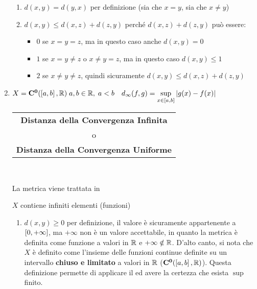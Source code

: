\begin{example}
\begin{enumerate}
\begin{enumerate}[label=\arabic*.]
				\item $d(x,y)=d(y,x)$ per definizione (sia che $x = y$, sia che $x \neq y$)
				\item $d(x,y) \leq d(x,z) + d(z,y)$ perché $d(x,z) + d(z,y)$ può essere:
					\begin{itemize}
						\item $0$ se $x = y = z$, ma in questo caso anche $d(x,y) = 0$
						\item $1$ se $x = y \neq z$ o $x \neq y = z$, ma in questo caso $d(x,y) \leq 1$
						\item $2$ se $x \neq y \neq z$, quindi sicuramente $d(x,y) \leq d(x,z) + d(z,y)$
					\end{itemize}
			\end{enumerate}
		\item $X=\mathbf{C^{0}}(\left[a,b\right],\mathbb{R})\;a,b\in\mathbb{R},\;a<b \quad d_\infty(f,g) = \sup\limits_{x\in\left[a,b\right]}\left|g(x)-f(x)\right|$ \hfill
			{\footnotesize
				\begin{tabular}{c}
					\textbf{Distanza della Convergenza Infinita}\\
					o\\
					\textbf{Distanza della Convergenza Uniforme}
				\end{tabular}
			}\label{ex:dim_dist_conv_unif}\\
			\begin{note}
				La metrica viene trattata in 
			\end{note}
			\begin{note}
				$X$ contiene infiniti elementi (funzioni)
			\end{note}
			\begin{center}
			\end{center}
			\begin{enumerate}[label=\arabic*.]
				\item $d(x,y) \geq 0$ per definizione, il valore è sicuramente appartenente a $\left[0,+\infty\right]$, ma $+\infty$ non è un valore accettabile, in quanto la metrica è definita come funzione a valori in $\mathbb{R}$ e $+\infty \notin \mathbb{R}$. D'alto canto, si nota che $X$ è definito come l'insieme delle funzioni continue definite su un intervallo \textbf{chiuso e limitato} a valori in $\mathbb{R}$ ($\mathbf{C^{0}}(\left[a,b\right],\mathbb{R})$). Questa definizione permette di applicare il  ed avere la certezza che esista $\sup$ finito.

\end{enumerate}
\end{enumerate}
\end{example}
